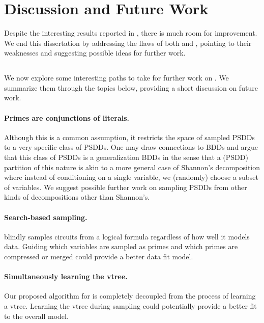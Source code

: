 \section{Discussion and Future Work}

Despite the interesting results reported in , there is much room for improvement.
We end this dissertation by addressing the flaws of both  and
, pointing to their weaknesses and suggesting possible ideas for further work.

\subsection{}

We now explore some interesting paths to take for further work on . We
summarize them through the topics below, providing a short discussion on future work.

\paragraph{Primes are conjunctions of literals.} Although this is a common assumption, it restricts
the space of sampled PSDDs to a very specific class of PSDDs. One may draw connections to BDDs and
argue that this class of PSDDs is a generalization BDDs in the sense that a (PSDD) partition of
this nature is akin to a more general case of Shannon's decomposition where instead of conditioning
on a single variable, we (randomly) choose a subset of variables. We suggest possible further work
on sampling PSDDs from other kinds of decompositions other than Shannon's.

\paragraph{Search-based sampling.}  blindly samples circuits from a logical
formula regardless of how well it models data. Guiding which variables are sampled as primes and
which primes are compressed or merged could provide a better data fit model.

\paragraph{Simultaneously learning the vtree.} Our proposed algorithm for  is
completely decoupled from the process of learning a vtree. Learning the vtree during sampling could
potentially provide a better fit to the overall model.

